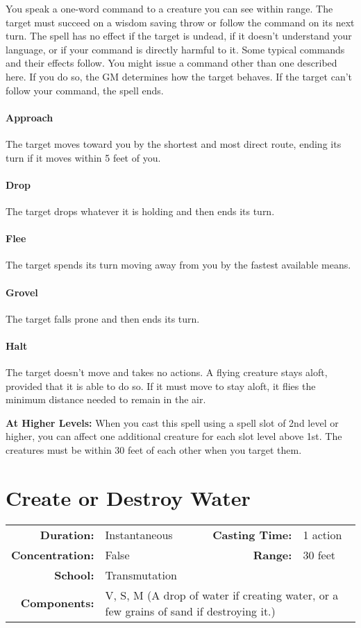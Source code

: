 \documentclass[a5paper, 12pt]{memoir}
\begin{document}
\vspace{1\baselineskip}\noindent You speak a one-word command to a creature you can see within range. The target must succeed on a wisdom saving throw or follow the command on its next turn. The spell has no effect if the target is undead, if it doesn't understand your language, or if your command is directly harmful to it. Some typical commands and their effects follow. You might issue a command other than one described here. If you do so, the GM determines how the target behaves. If the target can't follow your command, the spell ends. \paragraph{Approach} The target moves toward you by the shortest and most direct route, ending its turn if it moves within 5 feet of you. \paragraph{Drop} The target drops whatever it is holding and then ends its turn. \paragraph{Flee} The target spends its turn moving away from you by the fastest available means. \paragraph{Grovel} The target falls prone and then ends its turn. \paragraph{Halt} The target doesn't move and takes no actions. A flying creature stays aloft, provided that it is able to do so. If it must move to stay aloft, it flies the minimum distance needed to remain in the air.

\vspace{8pt} \noindent\textbf{At Higher Levels:} When you cast this spell using a spell slot of 2nd level or higher, you can affect one additional creature for each slot level above 1st. The creatures must be within 30 feet of each other when you target them.
\newpage
\section*{Create or Destroy Water}

{
\small\centering\vspace{-6pt}
\begin{tabular}{rlrl}
\toprule

\textbf{Duration:} & Instantaneous &
\textbf{Casting Time:} & 1 action \\
\textbf{Concentration:} & False &
\textbf{Range:} & 30 feet \\
\textbf{School:} & Transmutation \\
\textbf{Components:} & \multicolumn{3}{p{0.7\textwidth}}{V, S, M (A drop of water if creating water, or a few grains of sand if destroying it.)}\\

\bottomrule
\end{tabular}
}
\end{document}

